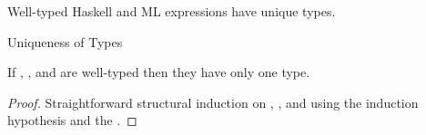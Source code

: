 Well-typed Haskell and ML expressions have unique types.

\begin{lemma}{Uniqueness of Types}

\label{lemuni}

If \varexph, \varexpm, and \varexps are well-typed then they have only one type.

\begin{proof}

Straightforward structural induction on \varexph, \varexpm, and \varexps using the induction hypothesis and the \proinv.

\end{proof}

\end{lemma}
